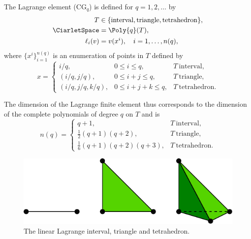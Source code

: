 \begin{definition}
  The Lagrange element ($\mathrm{CG}_q$) is defined for $q = 1, 2,
  \dots$ by
  \begin{align}
    T &\in \{ \mathrm{interval}{},
              \mathrm{triangle}{},
              \mathrm{tetrahedron}{}\}, \\
    \CiarletSpace &= \Poly{q}(T), \\
    \ell_i(v) &= v(x^i), \quad i = 1, \dots, n(q),
  \end{align}
  where $\{ x^i \}_{i=1}^{n(q)}$ is an enumeration of points in $T$
  defined by
  \begin{equation}
    x =
    \left \{
    \begin{array}{lll}
      i/q,             & 0 \leqslant i \leqslant q,         & T~\mathrm{interval}{}, \\
      (i/q, j/q),      & 0 \leqslant i + j \leqslant q,     & T~\mathrm{triangle}{}, \\
      (i/q, j/q, k/q), & 0 \leqslant i + j + k \leqslant q, & T~\mathrm{tetrahedron}{}.
    \end{array}
    \right.
  \end{equation}
\end{definition}
The dimension of the Lagrange finite element thus corresponds to the
dimension of the complete polynomials of degree $q$ on $T$ and is
\begin{equation}
  n(q) =
    \left \{
    \begin{array}{ll}
      q + 1, & T~\mathrm{interval}, \\
      \frac{1}{2} (q + 1)(q + 2), & T~\mathrm{triangle}, \\
      \frac{1}{6} (q + 1)(q + 2)(q + 3), & T~\mathrm{tetrahedron}.
    \end{array}
    \right.
\end{equation}

\begin{figure}
  \begin{center}
    \includegraphics[width=15cm]{chapters/kirby-6/pdf/P1_1d2d3d.pdf}
    \caption{The linear Lagrange interval, triangle and tetrahedron.}
    \label{kirby-6:fig:lagrange:dim}
  \end{center}
\end{figure}

